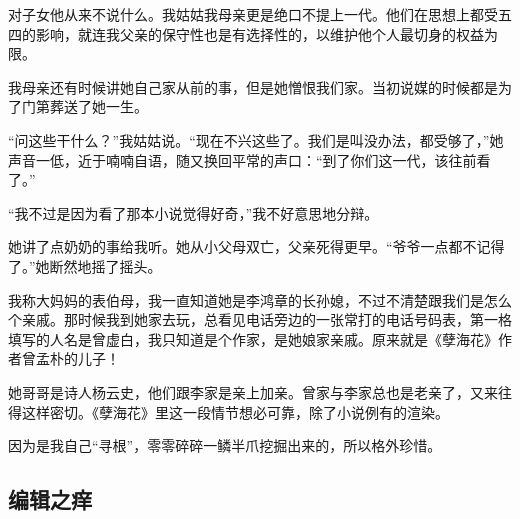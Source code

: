 \par 对子女他从来不说什么。我姑姑我母亲更是绝口不提上一代。他们在思想上都受五四的影响，就连我父亲的保守性也是有选择性的，以维护他个人最切身的权益为限。
\par 我母亲还有时候讲她自己家从前的事，但是她憎恨我们家。当初说媒的时候都是为了门第葬送了她一生。
\par “问这些干什么？”我姑姑说。“现在不兴这些了。我们是叫没办法，都受够了，”她声音一低，近于喃喃自语，随又换回平常的声口：“到了你们这一代，该往前看了。”
\par “我不过是因为看了那本小说觉得好奇，”我不好意思地分辩。
\par 她讲了点奶奶的事给我听。她从小父母双亡，父亲死得更早。“爷爷一点都不记得了。”她断然地摇了摇头。
\par 我称大妈妈的表伯母，我一直知道她是李鸿章的长孙媳，不过不清楚跟我们是怎么个亲戚。那时候我到她家去玩，总看见电话旁边的一张常打的电话号码表，第一格填写的人名是曾虚白，我只知道是个作家，是她娘家亲戚。原来就是《孽海花》作者曾孟朴的儿子！
\par 她哥哥是诗人杨云史，他们跟李家是亲上加亲。曾家与李家总也是老亲了，又来往得这样密切。《孽海花》里这一段情节想必可靠，除了小说例有的渲染。
\par 因为是我自己“寻根”，零零碎碎一鳞半爪挖掘出来的，所以格外珍惜。
















































\subsection{编辑之痒}


